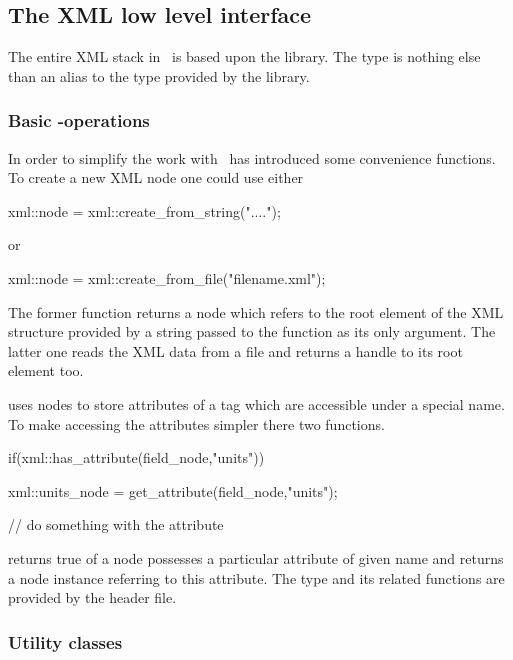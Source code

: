 \subsection{The XML low level interface}\label{sec:xml:lowlevel}

The entire XML stack in \libpniio\ is based upon the 
 library. The  type is 
nothing else than an alias to the  type provided by the 
 library.

\subsubsection{Basic -operations}

In order to simplify the work with  \libpniio\ has
introduced some convenience functions. 
To create a new XML node one could use either 
\begin{cppcode}
xml::node = xml::create_from_string("....");
\end{cppcode}
or
\begin{cppcode}
xml::node = xml::create_from_file("filename.xml");
\end{cppcode}
The former function returns a node which refers to the root element of the 
XML structure provided by a string passed to the function as its only argument. 
The latter one reads the XML data from a file and returns a handle to its 
root element too.

 uses nodes to store attributes of a tag which are 
accessible under a special name. To make accessing the attributes simpler 
there two functions.  
\begin{cppcode}
if(xml::has_attribute(field_node,"units"))
{
    xml::units_node = get_attribute(field_node,"units");

    // do something with the attribute
}
\end{cppcode}
 returns true of a node possesses a particular attribute of
given name and  returns a node instance referring to this 
attribute. 
The  type and its related functions are provided by the
 header file.

\subsubsection{Utility classes}

